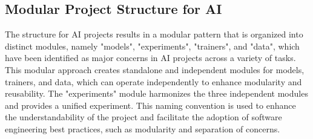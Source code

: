 




\subsection{Modular Project Structure for AI}



The structure for AI projects results in a modular pattern that is organized into distinct  modules, namely "models", "experiments", "trainers", and "data", which have been identified as major concerns in AI projects across a variety of tasks. This modular approach creates standalone and independent modules for models, trainers, and data, which can operate independently to enhance modularity and reusability. The "experiments" module harmonizes the three independent modules and provides a unified experiment. This naming convention is used to enhance the understandability of the project and facilitate the adoption of software engineering best practices, such as modularity and separation of concerns.

